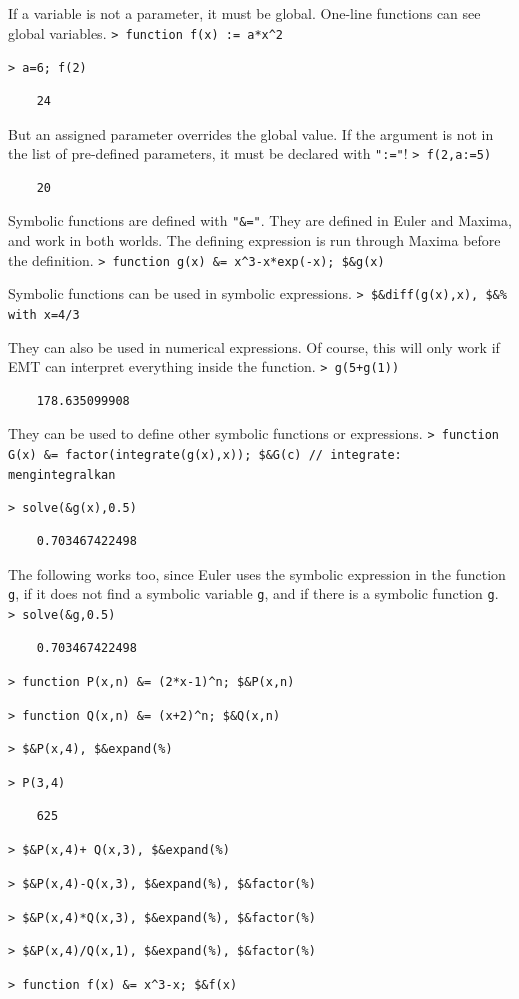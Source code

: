 \documentclass[11pt, a4paper]{article}
\newcommand{\emtcmd}[1]{\noindent\texttt{\textcolor{emtcommand}{>}\ #1}\par\smallskip}
\begin{document}
If a variable is not a parameter, it must be global. One-line functions can see global variables.
\emtcmd{function f(x) := a*x\^{}2}
\emtcmd{a=6; f(2)}
\begin{verbatim}
    24
\end{verbatim}

But an assigned parameter overrides the global value. If the argument is not in the list of pre-defined parameters, it must be declared with \texttt{":="}!
\emtcmd{f(2,a:=5)}
\begin{verbatim}
    20
\end{verbatim}

Symbolic functions are defined with \texttt{"\&="}. They are defined in Euler and Maxima, and work in both worlds. The defining expression is run through Maxima before the definition.
\emtcmd{function g(x) \&= x\^{}3-x*exp(-x); \$\&g(x)}

Symbolic functions can be used in symbolic expressions.
\emtcmd{\$\&diff(g(x),x), \$\&\% with x=4/3}

They can also be used in numerical expressions. Of course, this will only work if EMT can interpret everything inside the function.
\emtcmd{g(5+g(1))}
\begin{verbatim}
    178.635099908
\end{verbatim}

They can be used to define other symbolic functions or expressions.
\emtcmd{function G(x) \&= factor(integrate(g(x),x)); \$\&G(c) \textcolor{emtcomment}{// integrate: mengintegralkan}}
\emtcmd{solve(\&g(x),0.5)}
\begin{verbatim}
    0.703467422498
\end{verbatim}

The following works too, since Euler uses the symbolic expression in the function \texttt{g}, if it does not find a symbolic variable \texttt{g}, and if there is a symbolic function \texttt{g}.
\emtcmd{solve(\&g,0.5)}
\begin{verbatim}
    0.703467422498
\end{verbatim}
\emtcmd{function P(x,n) \&= (2*x-1)\^{}n; \$\&P(x,n)}
\emtcmd{function Q(x,n) \&= (x+2)\^{}n; \$\&Q(x,n)}
\emtcmd{\$\&P(x,4), \$\&expand(\%)}
\emtcmd{P(3,4)}
\begin{verbatim}
    625
\end{verbatim}
\emtcmd{\$\&P(x,4)+ Q(x,3), \$\&expand(\%)}
\emtcmd{\$\&P(x,4)-Q(x,3), \$\&expand(\%), \$\&factor(\%)}
\emtcmd{\$\&P(x,4)*Q(x,3), \$\&expand(\%), \$\&factor(\%)}
\emtcmd{\$\&P(x,4)/Q(x,1), \$\&expand(\%), \$\&factor(\%)}
\emtcmd{function f(x) \&= x\^{}3-x; \$\&f(x)}
\end{document}
